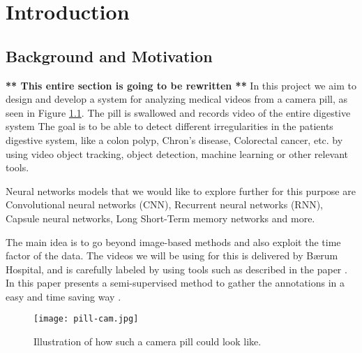 \documentclass[thesis.tex]{subfiles}
\begin{document}
\chapter{Introduction} \label{chap:introduction}

\section{Background and Motivation} \label{sec:background_and_motivation}
\textbf{** This entire section is going to be rewritten **} \bigbreak \noindent
In this project we aim to design and develop a system for analyzing medical videos from a camera pill, as seen in Figure \ref{fig:pill-cam}. The pill is swallowed and records video of the entire digestive system The goal is to be able to detect different irregularities in the patients digestive system, like a colon polyp, Chron's disease, Colorectal cancer, etc. by using video object tracking, object detection, machine learning or other relevant tools.

Neural networks models that we would like to explore further for this purpose are Convolutional neural networks (CNN), Recurrent neural networks (RNN), Capsule neural networks, Long Short-Term memory networks and more.

The main idea is to go beyond image-based methods and also exploit the time factor of the data. 
The videos we will be using for this is delivered by Bærum Hospital, and is carefully labeled by using tools such as described in the paper . In this paper \citeauthor*{ExpertDriven15} presents a semi-supervised method to gather the annotations in a easy and time saving way \cite{ExpertDriven15}.

\begin{figure}[H] %
  \begin{center}
    \texttt{[image: pill-cam.jpg]}
    \caption[Illustration of how such a camera pill could look like]{Illustration of how such a camera pill could look like\footnotemark.}
    \label{fig:pill-cam}
  \end{center}
\end{figure}
\end{document}
